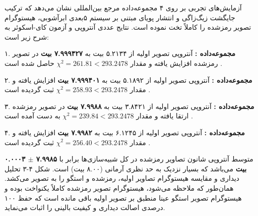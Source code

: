 

آزمایش‌های تجربی بر روی ۴ مجموعه‌داده مرجع بین‌المللی نشان می‌دهد که ترکیب جایگشت زیگ‌زاگی و انتشار پویای  مبتنی بر سیستم ۵بعدی ابرآشوبی، هیستوگرام تصویر رمزشده را کاملاً تخت نموده است. نتایج عددی آنتروپی و آزمون کای{-}اسکوئر به شرح زیر است:\par

۱. \textbf{مجموعه‌داده :} آنتروپی تصویر اولیه از ۵.۲۱۳۴ بیت به \textbf{۷.۹۹۹۴۲۷ بیت} در تصویر رمزشده افزایش یافته و مقدار $\chi^2 = 261.81 < 293.2478$ حاصل شده است .\par

۲. \textbf{مجموعه‌داده :} آنتروپی تصویر اولیه از ۵.۱۸۹۲ بیت به \textbf{۷.۹۹۹۴۰۱ بیت} افزایش یافته و مقدار $\chi^2 = 258.93 < 293.2478$ ثبت گردیده است .\par

۳. \textbf{مجموعه‌داده :} آنتروپی تصویر  اولیه از ۳.۸۴۲۱ بیت به \textbf{۷.۹۹۸۸ بیت} در تصویر رمزشده ارتقا یافته و مقدار $\chi^2 = 239.84 < 293.2478$ به دست آمده است .\par

۴. \textbf{مجموعه‌داده :} آنتروپی تصویر اولیه از ۶.۱۲۴۵ بیت به \textbf{۷.۹۹۸۲ بیت} افزایش یافته و مقدار $\chi^2 = 256.40 < 293.2478$ ثبت گردیده است .\par



متوسط آنتروپی شانون تصاویر رمزشده در کل شبیه‌سازی‌ها برابر با \textbf{۷.۹۹۸۵ \ensuremath{\pm} ۰.۰۰۰۳ بیت} می‌باشد که بسیار نزدیک به حد نظری آرمانی (۸.۰۰ بیت) است. شکل ۴{-}۳ تحلیل دیداری و مقایسه هیستوگرام تصاویر اولیه، رمزشده  و استگو  را به تصویر می‌کشد. همان‌طور که ملاحظه می‌شود، هیستوگرام تصویر رمزشده کاملاً یکنواخت بوده و هیستوگرام تصویر استگو عینا منطبق بر تصویر اولیه باقی مانده است که حفظ ۱۰۰ درصدی اصالت دیداری و کیفیت بالینی را اثبات می‌نماید.\par



